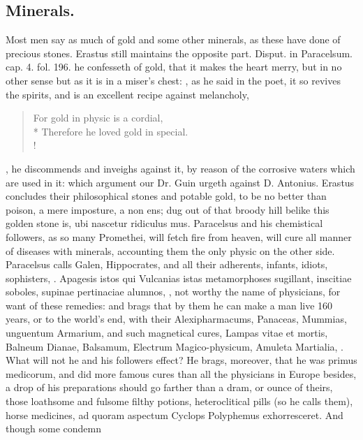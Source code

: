 {\subsection{Minerals.}
Most men say as much of gold and some other minerals, as
these have done of precious stones. Erastus still maintains the
opposite part. \textlatin{Disput. in Paracelsum. cap. 4. fol. 196.} he confesseth
of gold,  that it makes the heart merry, but in no other sense
but as it is in a miser's chest: , as he said in the poet, it so revives the spirits,
and is an excellent recipe against melancholy,
%
{\gothfont
\begin{verse}
For gold in physic is a cordial,\\*
Therefore he loved gold in special.\\!
\end{verse}
}
%
, he discommends and inveighs against it, by reason
of the corrosive waters which are used in it: which argument our Dr.
Guin urgeth against D. Antonius. Erastus concludes their
philosophical stones and potable gold, \etc{} to be no better than poison,
a mere imposture, a non ens; dug out of that broody hill belike this
golden stone is, ubi nascetur ridiculus mus. Paracelsus and his
chemistical followers, as so many Promethei, will fetch fire from
heaven, will cure all manner of diseases with minerals, accounting them
the only physic on the other side. Paracelsus calls Galen,
Hippocrates, and all their adherents, infants, idiots, sophisters, \etc{}.
Apagesis istos qui Vulcanias istas metamorphoses sugillant, inscitiae
soboles, supinae pertinaciae alumnos, \etc{}, not worthy the name of
physicians, for want of these remedies: and brags that by them he can
make a man live 160 years, or to the world's end, with their
Alexipharmacums, Panaceas, Mummias, unguentum Armarium, and such
magnetical cures, Lampas vitae et mortis, Balneum Dianae, Balsamum,
Electrum Magico-physicum, Amuleta Martialia, \etc{}. What will not he and
his followers effect? He brags, moreover, that he was primus medicorum,
and did more famous cures than all the physicians in Europe besides,
a drop of his preparations should go farther than a dram, or
ounce of theirs, those loathsome and fulsome filthy potions,
heteroclitical pills (so he calls them), horse medicines, ad quoram
aspectum Cyclops Polyphemus exhorresceret. And though some condemn
}
